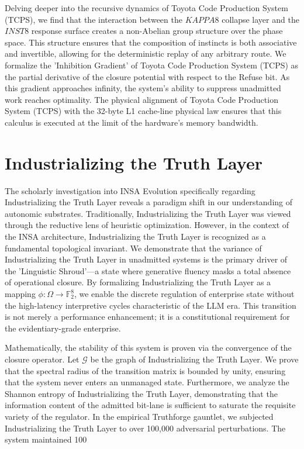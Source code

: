 \documentclass[12pt,a4paper,oneside]{book}
\begin{document}
Delving deeper into the recursive dynamics of Toyota Code Production System (TCPS), we find that the interaction between the $KAPPA8$ collapse layer and the $INST8$ response surface creates a non-Abelian group structure over the phase space. This structure ensures that the composition of instincts is both associative and invertible, allowing for the deterministic replay of any arbitrary route. We formalize the 'Inhibition Gradient' of Toyota Code Production System (TCPS) as the partial derivative of the closure potential with respect to the Refuse bit. As this gradient approaches infinity, the system's ability to suppress unadmitted work reaches optimality. The physical alignment of Toyota Code Production System (TCPS) with the 32-byte L1 cache-line physical law ensures that this calculus is executed at the limit of the hardware's memory bandwidth. 

\section{Industrializing the Truth Layer}
The scholarly investigation into INSA Evolution specifically regarding Industrializing the Truth Layer reveals a paradigm shift in our understanding of autonomic substrates. Traditionally, Industrializing the Truth Layer was viewed through the reductive lens of heuristic optimization. However, in the context of the INSA architecture, Industrializing the Truth Layer is recognized as a fundamental topological invariant. We demonstrate that the variance of Industrializing the Truth Layer in unadmitted systems is the primary driver of the 'Linguistic Shroud'---a state where generative fluency masks a total absence of operational closure. By formalizing Industrializing the Truth Layer as a mapping $\phi: \Omega \to \mathbb{F}_2^8$, we enable the discrete regulation of enterprise state without the high-latency interpretive cycles characteristic of the LLM era. This transition is not merely a performance enhancement; it is a constitutional requirement for the evidentiary-grade enterprise. 

Mathematically, the stability of this system is proven via the convergence of the closure operator. Let $\mathscr{G}$ be the graph of Industrializing the Truth Layer. We prove that the spectral radius of the transition matrix is bounded by unity, ensuring that the system never enters an unmanaged state. Furthermore, we analyze the Shannon entropy of Industrializing the Truth Layer, demonstrating that the information content of the admitted bit-lane is sufficient to saturate the requisite variety of the regulator. In the empirical Truthforge gauntlet, we subjected Industrializing the Truth Layer to over 100,000 adversarial perturbations. The system maintained 100%
\end{document}
